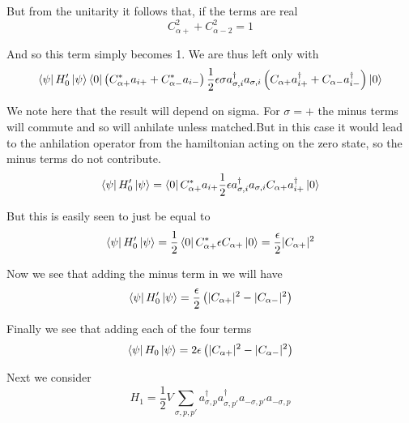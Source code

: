 \documentclass[11pt]{article} %
\begin{document}
But from the unitarity it follows that, if the terms are real\\

\begin{equation}C_{\alpha+}^2+C_{\alpha-2}^2=1 \end{equation}

And so this term simply becomes 1. We are thus left only with\\

\begin{equation}
\bra{\psi}H_0'\ket{\psi} \bra{0}\left(C_{\alpha+}^*a_{i+}+C_{\alpha -}^*a_{i -} \right) \frac{1}{2}\epsilon  \sigma a_{\sigma,i}^\dagger a_{\sigma,i}\left(C_{\alpha+}a_{i+}^\dagger+C_{\alpha -}a_{i -}^\dagger \right) \ket{0}\end{equation}


We note here that the result will depend on sigma. For $\sigma=+$ the minus terms will commute and so will anhilate unless matched.But in this case it would lead to the anhilation operator from the hamiltonian acting on the zero state, so the minus terms do not contribute.\\

\begin{equation}
\bra{\psi}H_0'\ket{\psi} =\bra{0}C_{\alpha+}^*a_{i+} \frac{1}{2}\epsilon   a_{\sigma,i}^\dagger a_{\sigma,i}C_{\alpha+}a_{i+}^\dagger \ket{0}\end{equation}

But this is easily seen to just be equal to
\begin{equation}
\bra{\psi}H_0'\ket{\psi}=\frac{1}{2} \bra{0}C_{\alpha+}^*\epsilon C_{\alpha+} \ket{0}=\frac{\epsilon}{2}|C_{\alpha +}|^2\end{equation}

Now we see that adding the minus term in we will have\\
\begin{equation}
\bra{\psi}H_0'\ket{\psi}=\frac{\epsilon}{2}\left(|C_{\alpha +}|^2-|C_{\alpha-}|^2\right)\end{equation}

Finally we see that adding each of the four terms\\
\begin{equation} \bra{\psi}H_0 \ket{\psi}= 2\epsilon \left(|C_{\alpha +}|^2-|C_{\alpha-}|^2\right) \end{equation}

Next we consider \\
\begin{equation}
H_1=\frac{1}{2}V \sum_{\sigma,p,p'} a_{\sigma,p}^\dagger a_{\sigma,p'}^\dagger a_{-\sigma,p'}a_{-\sigma,p} \end{equation}
\end{document}
